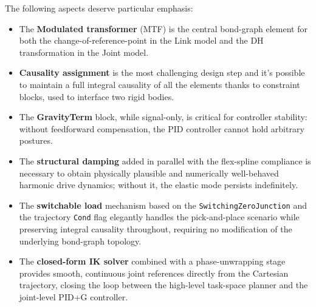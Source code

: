 The following aspects deserve particular emphasis:
\begin{itemize}
  \item The \textbf{Modulated transformer} (MTF) is the central bond-graph element for both the change-of-reference-point in the Link model and the DH transformation in the Joint model.
  \item \textbf{Causality assignment} is the most challenging design step and it's possible to maintain a full integral causality of all the elements thanks to constraint blocks, used to interface two rigid bodies. 
  \item The \textbf{GravityTerm} block, while signal-only, is critical for controller stability: without feedforward compensation, the PID controller cannot hold arbitrary postures.
  \item The \textbf{structural damping} added in parallel with the flex-spline compliance is necessary to obtain physically plausible and numerically well-behaved harmonic drive dynamics; without it, the elastic mode persists indefinitely.
  \item The \textbf{switchable load} mechanism based on the \texttt{SwitchingZeroJunction} and the trajectory \texttt{Cond} flag elegantly handles the pick-and-place scenario while preserving integral causality throughout, requiring no modification of the underlying bond-graph topology.
  \item The \textbf{closed-form IK solver} combined with a phase-unwrapping stage provides smooth, continuous joint references directly from the Cartesian trajectory, closing the loop between the high-level task-space planner and the joint-level PID+G controller.
\end{itemize}